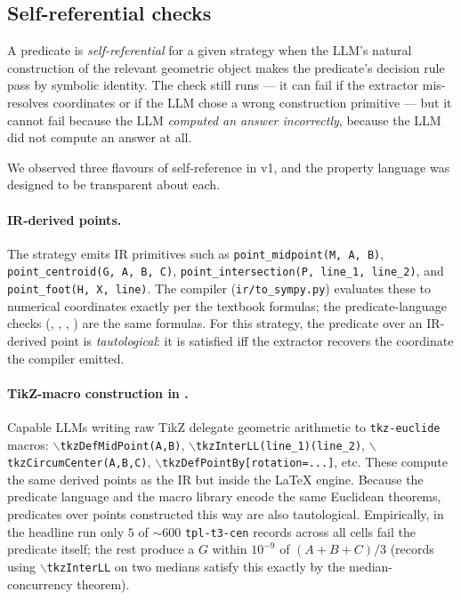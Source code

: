 \subsection{Self-referential checks}
\label{ssec:self_referential_checks}

A predicate is \emph{self-referential} for a given strategy when the LLM's natural construction of the relevant geometric object makes the predicate's decision rule pass by symbolic identity.
The check still runs --- it can fail if the extractor mis-resolves coordinates or if the LLM chose a wrong construction primitive --- but it cannot fail because the LLM \emph{computed an answer incorrectly}, because the LLM did not compute an answer at all.

We observed three flavours of self-reference in v1, and the property language was designed to be transparent about each.

\paragraph{IR-derived points.} The \structured strategy emits IR primitives such as \texttt{point\_midpoint(M, A, B)}, \texttt{point\_centroid(G, A, B, C)}, \texttt{point\_intersection(P, line\_1, line\_2)}, and \texttt{point\_foot(H, X, line)}.
The compiler (\texttt{ir/to\_sympy.py}) evaluates these to numerical coordinates exactly per the textbook formulas; the predicate-language checks (, , , ) are the same formulas.
For this strategy, the predicate over an IR-derived point is \emph{tautological}: it is satisfied iff the extractor recovers the coordinate the compiler emitted.

\paragraph{TikZ-macro construction in \rawcode.} Capable LLMs writing raw TikZ delegate geometric arithmetic to \texttt{tkz-euclide} macros: $\backslash$\texttt{tkzDefMidPoint(A,B)}, $\backslash$\texttt{tkzInterLL(line\_1)(line\_2)}, $\backslash$\texttt{tkzCircumCenter(A,B,C)}, $\backslash$\texttt{tkzDefPointBy[rotation=...]}, etc.
These compute the same derived points as the IR but inside the LaTeX engine.
Because the predicate language and the macro library encode the same Euclidean theorems, predicates over points constructed this way are also tautological.
Empirically, in the headline run only $5$ of $\sim 600$ \texttt{tpl-t3-cen} records across all cells fail the  predicate itself; the rest produce a $G$ within $10^{-9}$ of $(A+B+C)/3$ (\rawcode records using $\backslash$\texttt{tkzInterLL} on two medians satisfy this exactly by the median-concurrency theorem).

